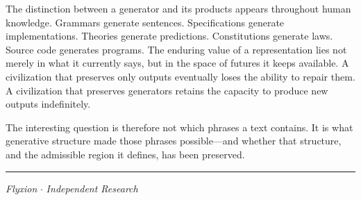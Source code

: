 \documentclass[12pt]{article}
\begin{document}
The distinction between a generator and its products appears throughout human knowledge. Grammars generate sentences. Specifications generate implementations. Theories generate predictions. Constitutions generate laws. Source code generates programs. The enduring value of a representation lies not merely in what it currently says, but in the space of futures it keeps available. A civilization that preserves only outputs eventually loses the ability to repair them. A civilization that preserves generators retains the capacity to produce new outputs indefinitely.

The interesting question is therefore not which phrases a text contains. It is what generative structure made those phrases possible---and whether that structure, and the admissible region it defines, has been preserved.

\vspace{2em}
\hrule
\vspace{1em}

\begin{center}
\small \textit{Flyxion} \quad $\cdot$ \quad \textit{Independent Research}
\end{center}
\end{document}
